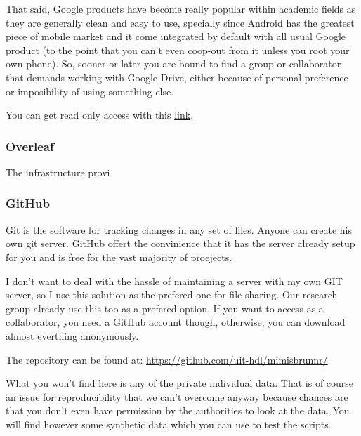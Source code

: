 That said, Google products have become really popular within academic fields as they are generally clean and easy to use, specially since Android has the greatest piece of mobile market and it come integrated by default with all usual Google product (to the point that you can't even coop-out from it unless you root your own phone). So, sooner or later you are bound to find a group or collaborator that demands working with Google Drive, either because of personal preference or imposibility of using something else.\vspace{3 mm}

You can get read only access with this \href{https://drive.google.com/drive/folders/1ouVgSilqXLdPTj7P0gyoKuUL59eymPLf?usp=sharing}{link}.

\subsubsection{Overleaf}

The infrastructure provi\vspace{3 mm}

\subsubsection{GitHub}

Git is the software for tracking changes in any set of files. Anyone can create his own git server. GitHub offert the convinience that it has the server already setup for you and is free for the vast majority of proejects.\vspace{3 mm}

I don't want to deal with the hassle of maintaining a server with my own GIT server, so I use this solution as the prefered one for file sharing. Our research group already use this too as a prefered option. If you want to access as a collaborator, you need a GitHub account though, otherwise, you can download almost everthing anonymously.\vspace{3 mm}

The repository can be found at: \href{https://github.com/uit-hdl/mimisbrunnr/}{https://github.com/uit-hdl/mimisbrunnr/}.\vspace{3 mm}

What you won't find here is any of the private individual data. That is of course an issue for reproducibility that we can't overcome anyway because chances are that you don't even have permission by the authorities to look at the data. You will find however some synthetic data which you can use to test the scripts.\vspace{3 mm}


